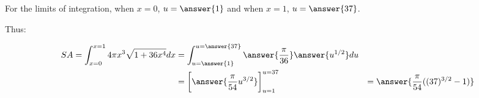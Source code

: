 \documentclass{ximera}
\begin{document}
\begin{exercise}
\begin{exercise}
\begin{exercise}
\begin{exercise}
\begin{hint}
For the limits of integration,  when $x=0$, $u= \answer{1}$ and when $x=1$, $u=\answer{37}$.

Thus:

\begin{align*}
SA= \int_{x=0}^{x=1} 4 \pi x^3 \sqrt{1+36x^4} dx &=  \int_{u=\answer{1}}^{u=\answer{37}} \answer{\frac{\pi}{36}} \answer{u^{1/2}} du \\
&=  \bigg[\answer{\frac{\pi}{54} u^{3/2 } }\bigg]_{u=1}^{u=37}
&= \answer{\frac \pi {54} ((37)^{3/2} -1)}
\end{align*}
\end{hint}


\end{exercise}
\end{exercise}
\end{exercise}
\end{exercise}
\end{document}
